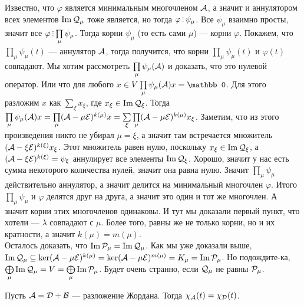 \documentclass{article}
\DeclareMathOperator{\operIm}{Im}
\let\Im\operIm
\newcommand{\id}{{\mathcal{E}}}
\begin{document}
\begin{itemize}
\begin{Proof}
            Известно, что $\varphi$ является минимальным многочленом ${\mathcal{A}}$, а значит и аннулятором всех элементов $\Im\scriptQ_\mu$ тоже является, но тогда $\varphi\divby\psi_\mu$. Все $\psi_\mu$ взаимно просты, значит все $\varphi\divby\prod\limits_{\mu}\psi_\mu$. Тогда корни $\psi_\mu$ (то есть сами $\mu$) --- корни $\varphi$. Покажем, что $\prod\limits_{\mu}\psi_\mu(t)$ --- аннулятор ${\mathcal{A}}$, тогда получится, что корни $\prod\limits_{\mu}\psi_\mu(t)$ и $\varphi(t)$ совпадают. Мы хотим рассмотреть $\prod\limits_{\mu}\psi_\mu({\mathcal{A}})$ и доказать, что это нулевой оператор. Или что для любого $x\in V$ $\prod\limits_{\mu}\psi_\mu(\scriptA)x=\mathbb0$. Для этого разложим $x$ как $\sum\limits_\xi x_\xi$, где $x_\xi\in\Im\scriptQ_\xi$. Тогда $\prod\limits_{\mu}\psi_\mu(\scriptA)x=\prod\limits_{\mu}(\scriptA-\mu\id)^{k(\mu)}x=\sum\limits_\xi\prod\limits_{\mu}(\scriptA-\mu\id)^{k(\mu)}x_\xi$. Заметим, что из этого произведения никто не убирал $\mu=\xi$, а значит там встречается множитель $(\scriptA-\xi\id)^{k(\xi)}x_\xi$. Этот множитель равен нулю, поскольку $x_\xi\in\Im\scriptQ_\xi$, а $(\scriptA-\xi\id)^{k(\xi)}=\psi_\xi$ аннулирует все элементы $\Im\scriptQ_\xi$. Хорошо, значит у нас есть сумма некоторого количества нулей, значит она равна нулю. Значит $\prod\limits_{\mu}\psi_\mu$ действительно аннулятор, а значит делится на минимальный многочлен $\varphi$. Итого $\prod\limits_{\mu}\psi_\mu$ и $\varphi$ делятся друг на друга, а значит это один и тот же многочлен. А значит корни этих многочленов одинаковы. И тут мы доказали первый пункт, что хотели --- $\lambda$ совпадают с $\mu$. Более того, равны же не только корни, но и их кратности, а значит $k(\mu)=m(\mu)$.\\
            Осталось доказать, что $\Im\scriptP_\mu=\Im\scriptQ_\mu$. Как мы уже доказали выше, $\Im\scriptQ_\mu\subseteq\ker(\scriptA-\mu\id)^{k(\mu)}=\ker(\scriptA-\mu\id)^{m(\mu)}=K_\mu=\Im\scriptP_\mu$. Но подождите-ка, $\bigoplus\limits_\mu\Im\scriptQ_\mu=V=\bigoplus\limits_\mu\Im\scriptP_\mu$. Будет очень странно, если ${\mathcal{Q}}_\mu$ не равны ${\mathcal{P}}_\mu$.
        \end{Proof}
        \thm Пусть ${\mathcal{A}}={\mathcal{D}}+{\mathcal{B}}$ --- разложение Жордана. Тогда $\chi_{\mathcal{A}}(t)=\chi_{\mathcal{D}}(t)$.
        \begin{Proof}

\end{Proof}
\end{itemize}
\end{document}
